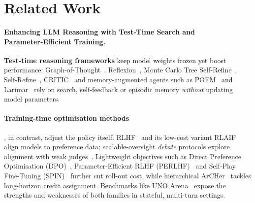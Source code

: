 \section{Related Work}
\paragraph{Enhancing LLM Reasoning with Test‑Time Search and Parameter‑Efficient Training.} \textbf{Test-time reasoning frameworks} keep model weights frozen yet boost performance: 
Graph-of-Thought~\citep{peng2023got}, Reflexion~\citep{shinn2023reflexion}, 
Monte Carlo Tree Self-Refine~\citep{zhang2024mcts}, Self-Refine~\citep{madaan2023selfrefine}, 
CRITIC~\citep{gou2023critic} and memory-augmented agents such as 
POEM~\citep{do2024poem} and Larimar~\citep{liu2024larimar} rely on search, self-feedback or episodic memory \emph{without} updating model parameters. 

\paragraph{Training-time optimisation methods}, in contrast, adjust the policy itself.  
RLHF~\citep{christiano2017deep, instructgpt} and its low-cost variant RLAIF~\citep{lee2023rlaif} align models to preference data; scalable-oversight \emph{debate} protocols explore alignment with weak judges~\citep{kenton2024scalable}.  
Lightweight objectives such as Direct Preference Optimisation (DPO)~\citep{rafailov2023dpo}, Parameter-Efficient RLHF (PERLHF)~\citep{sidahmed2024perlhf} and Self-Play Fine-Tuning (SPIN)~\citep{chen2024spin} further cut roll-out cost, while hierarchical ArCHer~\citep{archer} tackles long-horizon credit assignment.  
Benchmarks like UNO Arena~\citep{qin2024unoarena} expose the strengths and weaknesses of both families in stateful, multi-turn settings.

